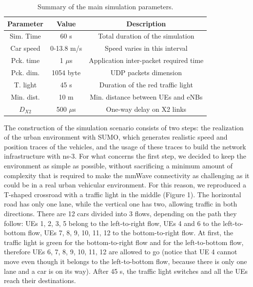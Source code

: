 \documentclass[conference,10pt]{IEEEtran}
\begin{document}
\begin{table}[]
	\begin{center}
			\caption{Summary of the main simulation parameters.}
		\begin{tabular}{ccc}
			\toprule
			
		    Parameter & Value & Description  \\
			\midrule
			
			Sim. Time & 60 s & Total duration of the simulation \\
			Car speed & 0-13.8 m/s & Speed varies in this interval \\
			Pck. time & 1 $\mu$s & Application inter-packet required time \\
			Pck. dim. & 1054 byte & UDP packets dimension \\			
			T. light  & 45 s & Duration of the red traffic light \\ 			
			Min. dist. & 10 m & Min. distance between UEs and eNBs \\
			$D_{X2}$ & 500 $\mu$s & One-way delay on X2 links \\
			
			\bottomrule
		\end{tabular}
    \end{center}
	\label{tab:bay3}
\end{table}


The construction of the simulation scenario consists of two steps: the realization of the urban environment with SUMO, which generates realistic speed and position traces of the vehicles, and the usage of these traces to build the network infrastructure with ns-3.
For what concerns the first step, we decided to keep the environment as simple as possible, without sacrificing a minimum amount of complexity that is required to make the mmWave connectivity as challenging as it could be in a real urban vehicular environment. For this reason, we reproduced a T-shaped crossroad with a traffic light in the middle (Figure 1). The horizontal road has only one lane, while the vertical one has two, allowing traffic in both directions. There are 12 cars divided into 3 flows, depending on the path they follow: UEs 1, 2, 3, 5 belong to the left-to-right flow, UEs 4 and 6 to the left-to-bottom flow, UEs 7, 8, 9, 10, 11, 12 to the bottom-to-right flow.
At first, the traffic light is green for the bottom-to-right flow and for the left-to-bottom flow, therefore UEs 6, 7, 8, 9, 10, 11, 12 are allowed to go (notice that UE 4 cannot move even though it belongs to the left-to-bottom flow, because there is only one lane and a car is on its way). After 45 s, the traffic light switches and all the UEs reach their destinations.
\end{document}
